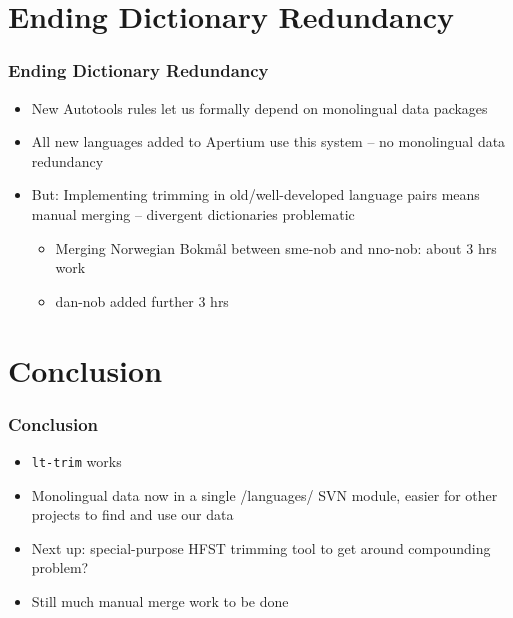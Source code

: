\documentclass[notes=hide]{beamer}
\newcommand{\tool}[1]{\texttt{#1}}
\begin{document}
\section{Ending Dictionary Redundancy}
\begin{frame}
  \frametitle{Ending Dictionary Redundancy}
  \begin{itemize}
  \item New Autotools rules let us formally depend on monolingual data
    packages
  \item All new languages added to Apertium use this system – no
    monolingual data redundancy
  \item But: Implementing trimming in old/well-developed language
    pairs means manual merging – divergent dictionaries problematic
    \begin{itemize}
    \item Merging Norwegian Bokmål between sme-nob and nno-nob: about
      3 hrs work
    \item dan-nob added further 3 hrs
    \end{itemize}
  \end{itemize}
\end{frame}

\section{Conclusion}
\begin{frame}
  \frametitle{Conclusion}
  \begin{itemize}
  \item \tool{lt-trim} works
  \item Monolingual data now in a single /languages/ SVN module,
    easier for other projects to find and use our data \\

  \item Next up: special-purpose HFST trimming tool to get around
    compounding problem?
  \item Still much manual merge work to be done
  \end{itemize}
\end{frame}

\end{document}

